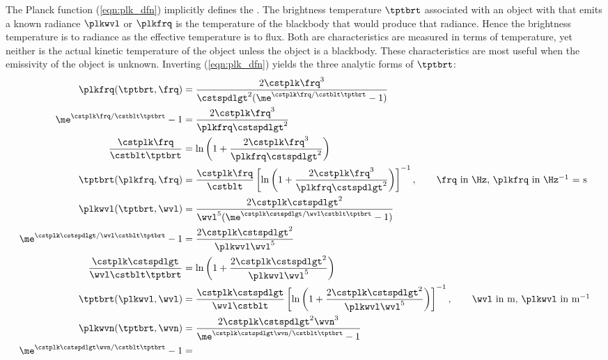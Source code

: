 \documentclass[12pt]{article}
\begin{document}
The Planck function (\ref{eqn:plk_dfn}) implicitly defines the
.
The brightness temperature $\tptbrt$ associated with an object with
that emits a known radiance $\plkwvl$ or $\plkfrq$ is the temperature
of the blackbody that would produce that radiance.
Hence the brightness temperature is to radiance as the effective
temperature is to flux.
Both are characteristics are measured in terms of temperature, yet
neither is the actual kinetic temperature of the object unless the
object is a blackbody.
These characteristics are most useful when the emissivity of the
object is unknown.
Inverting (\ref{eqn:plk_dfn}) yields the three analytic forms of
$\tptbrt$: 
\begin{subequations}
\label{eqn:tpt_brt_dfn}
\begin{align}
\label{eqn:tpt_brt_frq_dfn}
\plkfrq(\tptbrt,\frq) & = \frac{2 \cstplk \frq^{3}}{\cstspdlgt^{2} 
( \me^{\cstplk \frq / \cstblt \tptbrt} - 1)} \nonumber \\
\me^{\cstplk \frq / \cstblt \tptbrt} - 1 & =
\frac{2 \cstplk \frq^{3}}{\plkfrq \cstspdlgt^{2}} \nonumber \\
\frac{\cstplk \frq}{\cstblt \tptbrt} & =
\ln \left( 1 + \frac{ 2 \cstplk \frq^{3}}{\plkfrq \cstspdlgt^{2}} \right) \nonumber \\
\tptbrt(\plkfrq,\frq) & = \frac{\cstplk \frq}{\cstblt}
\left[ \ln \left( 1 + \frac{ 2 \cstplk \frq^{3}}{\plkfrq \cstspdlgt^{2}} \right) \right]^{-1},
\qquad \mbox{\frq\ in \Hz, \plkfrq\ in \Hz$^{-1}$ = s} \\
\label{eqn:tpt_brt_wvl_dfn}
\plkwvl(\tptbrt,\wvl) & = \frac{2 \cstplk \cstspdlgt^{2}}{\wvl^{5} 
( \me^{\cstplk \cstspdlgt / \wvl \cstblt \tptbrt} - 1)} \nonumber \\
\me^{\cstplk \cstspdlgt / \wvl \cstblt \tptbrt} - 1 & =
\frac{2 \cstplk \cstspdlgt^{2}} {\plkwvl \wvl^{5}} \nonumber \\
\frac{\cstplk \cstspdlgt}{\wvl \cstblt \tptbrt} & =
\ln \left( 1 + \frac{2 \cstplk \cstspdlgt^{2}}{\plkwvl \wvl^{5}} \right) \nonumber \\
\tptbrt(\plkwvl,\wvl) & = \frac{\cstplk \cstspdlgt}{\wvl \cstblt}
\left[ \ln \left( 1 + \frac{2 \cstplk \cstspdlgt^{2}}{\plkwvl \wvl^{5}} \right) \right]^{-1},
\qquad \mbox{\wvl\ in m, \plkwvl\ in m$^{-1}$} \\ 
\label{eqn:tpt_brt_wvn_dfn}
\plkwvn(\tptbrt,\wvn) & = \frac{2 \cstplk \cstspdlgt^{2} \wvn^{3}}
{\me^{\cstplk \cstspdlgt \wvn / \cstblt \tptbrt} - 1} \nonumber \\
\me^{\cstplk \cstspdlgt \wvn / \cstblt \tptbrt} - 1 & =

\end{align}
\end{subequations}
\end{document}
